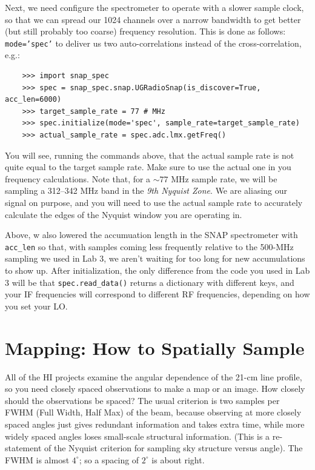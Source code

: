\documentclass[psfig,preprint]{aastex}
\begin{document}
Next, we need configure the spectrometer to operate with a slower sample clock, so that we can spread our 1024
channels over a narrow bandwidth to get better (but still probably too coarse) frequency resolution.
This is done as follows:
\texttt{mode='spec'} to deliver us two auto-correlations instead of the cross-correlation, e.g.:
\begin{verbatim}
    >>> import snap_spec
    >>> spec = snap_spec.snap.UGRadioSnap(is_discover=True, acc_len=6000)
    >>> target_sample_rate = 77 # MHz
    >>> spec.initialize(mode='spec', sample_rate=target_sample_rate)
    >>> actual_sample_rate = spec.adc.lmx.getFreq()
\end{verbatim}
\noindent
You will see, running the commands above, that the actual sample rate is not quite equal to the target sample rate. Make
sure to use the actual one in you frequency calculations. Note that, for a $\sim77$ MHz sample rate, we will be sampling a
312--342 MHz band in the {\it 9th Nyquist Zone}. We are aliasing our signal on purpose, and you will need to use the actual sample
rate to accurately calculate the edges of the Nyquist window you are operating in.

Above, w also lowered the accumuation length in the SNAP spectrometer with \texttt{acc\_len}
so that, with samples coming less frequently relative to the 500-MHz sampling we used in Lab 3, we aren't waiting for too long for new
accumulations to show up.
After initialization, the only difference from the code you used in Lab 3 will be that \texttt{spec.read\_data()} returns
a dictionary with different keys, and your IF frequencies will correspond to different
RF frequencies, depending on how you set your LO.
 
\section{Mapping: How to Spatially Sample} \label{sampling} 

\noindent
All of the HI projects examine the angular dependence of the 21-cm line
profile, so you need closely spaced observations to make a map or an
image. How closely should the observations be spaced?  The usual
criterion is two samples per FWHM (Full Width, Half Max) of the beam, because
observing at more closely spaced angles just gives redundant information
and takes extra time, while more widely spaced angles loses small-scale
structural information. (This is a re-statement of the Nyquist criterion for sampling
sky structure versus angle).  The FWHM is
almost $4^\circ$; so a spacing of $2^\circ$ is about right.
\end{document}
